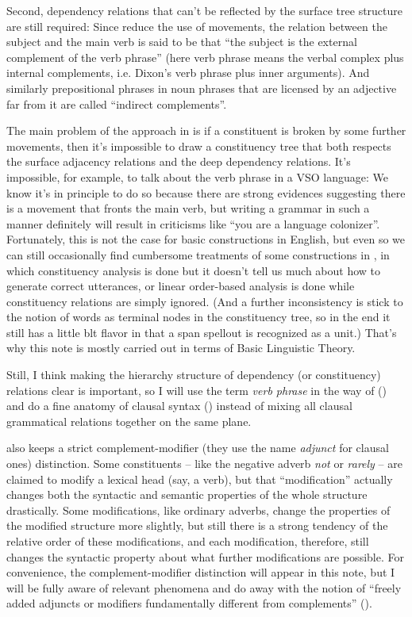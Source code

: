 \documentclass[UTF8, a4paper, oneside, scheme=plain]{ctexrep}
\newcommand*{\term}[1]{\emph{#1}}
\newcommand{\corpus}[1]{\emph{#1}}
\begin{document}
Second, dependency relations that can't be reflected by the surface tree structure are still required:
Since \citet{cgel} reduce the use of movements,
the relation between the subject and the main verb 
is said to be that ``the subject is the external complement of the verb phrase''
(here verb phrase means the verbal complex plus internal complements,
i.e. Dixon's verb phrase plus inner arguments).
And similarly prepositional phrases in noun phrases that are licensed by an adjective far from it 
are called ``indirect complements''.

The main problem of the approach in \citet{cgel} is 
if a constituent is broken by some further movements,
then it's impossible to draw a constituency tree that 
both respects the surface adjacency relations 
and the deep dependency relations.
It's impossible, for example, to talk about the verb phrase in a VSO language:
We know it's in principle to do so because
there are strong evidences suggesting there is a movement that fronts the main verb,
but writing a grammar in such a manner definitely will result in criticisms like 
``you are a language colonizer''.
Fortunately, this is not the case for basic constructions in English,
but even so we can still occasionally find cumbersome treatments of some constructions in \citet{cgel},
in which constituency analysis is done but it doesn't tell us much about 
how to generate correct utterances,
or linear order-based analysis is done while constituency relations are simply ignored.
(And a further inconsistency is \citet{cgel} stick 
to the notion of words as terminal nodes in the constituency tree,
so in the end it still has a little \acl{blt} flavor 
in that a span spellout is recognized as a unit.)
That's why this note is mostly carried out in terms of Basic Linguistic Theory.

Still, I think making the hierarchy structure of dependency (or constituency) relations clear 
is important,
so I will use the term \term{verb phrase} in the way of \citet{cgel} ()
and do a fine anatomy of clausal syntax ()
instead of mixing all clausal grammatical relations together on the same plane.

\cite{cgel} also keeps a strict complement-modifier 
(they use the name \term{adjunct} for clausal ones) distinction.
Some constituents -- like the negative adverb \corpus{not} or \corpus{rarely} -- 
are claimed to modify a lexical head (say, a verb),
but that ``modification'' actually changes 
both the syntactic and semantic properties of the whole structure drastically.
Some modifications, like ordinary adverbs,
change the properties of the modified structure more slightly,
but still there is a strong tendency of the relative order of these modifications,
and each modification, therefore, still changes the syntactic property 
about what further modifications are possible.
For convenience, the complement-modifier distinction will appear in this note,
but I will be fully aware of relevant phenomena
and do away with the notion of 
``freely added adjuncts or modifiers fundamentally different from complements'' ().
\end{document}
